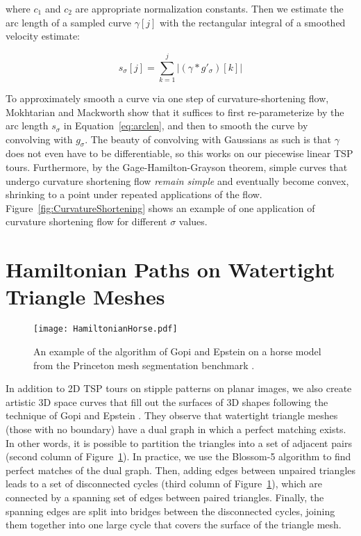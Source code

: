 \documentclass[runningheads]{llncs}
\begin{document}
where $c_1$ and $c_2$ are appropriate normalization constants.  Then we estimate the arc length of a sampled curve $\gamma[j]$ with the rectangular integral of a smoothed velocity estimate:

\begin{equation}
  \label{eq:arclen}
  s_{\sigma}[j] = \sum_{k=1}^j |(\gamma * g'_{\sigma})[k]|
\end{equation}

To approximately smooth a curve via one step of curvature-shortening flow, Mokhtarian and Mackworth \cite{mokhtarian1992theory} show that it suffices to first re-parameterize by the arc length $s_{\sigma}$ in Equation~\ref{eq:arclen}, and then to smooth the curve by convolving with $g_{\sigma}$.  The beauty of convolving with Gaussians as such is that $\gamma$ does not even have to be differentiable, so this works on our piecewise linear TSP tours.  Furthermore, by the Gage-Hamilton-Grayson theorem, simple curves that undergo curvature shortening flow {\em remain simple} and eventually become convex, shrinking to a point under repeated applications of the flow.  Figure~\ref{fig:CurvatureShortening} shows an example of one application of curvature shortening flow for different $\sigma$ values.



\section{Hamiltonian Paths on Watertight Triangle Meshes}
\label{sec:hamiltonian}

\begin{figure}
  \centering
  \texttt{[image: HamiltonianHorse.pdf]}
  \caption{An example of the algorithm of Gopi and Epstein \cite{gopi2004single} on a horse model from the Princeton mesh segmentation benchmark \cite{Chen:2009:ABF}.}
  \label{fig:HamiltonianHorse}
\end{figure}

In addition to 2D TSP tours on stipple patterns on planar images, we also create artistic 3D space curves that fill out the surfaces of 3D shapes following the technique of Gopi and Epstein \cite{gopi2004single}.  They observe that watertight triangle meshes (those with no boundary) have a dual graph in which a perfect matching exists.  In other words, it is possible to partition the triangles into a set of adjacent pairs (second column of Figure~\ref{fig:HamiltonianHorse}).  In practice, we use the Blossom-5 algorithm \cite{kolmogorov2009blossom} to find perfect matches of the dual graph.  Then, adding edges between unpaired triangles leads to a set of disconnected cycles (third column of Figure~\ref{fig:HamiltonianHorse}), which are connected by a spanning set of edges between paired triangles.  Finally, the spanning edges are split into bridges between the disconnected cycles, joining them together into one large cycle that covers the surface of the triangle mesh.
\end{document}
